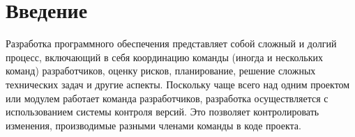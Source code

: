 \documentclass[14pt]{matmex-diploma-custom}
\begin{document}
\maketitle
\tableofcontents
\section*{Введение}
    Разработка программного обеспечения представляет собой сложный и долгий процесс, включающий в себя координацию команды (иногда и нескольких команд) разработчиков, оценку рисков, планирование, решение сложных технических задач и другие аспекты. Поскольку чаще всего над одним проектом или модулем работает команда разработчиков, разработка осуществляется с использованием системы контроля версий. Это позволяет контролировать изменения, производимые разными членами команды в коде проекта.
    
\end{document}
